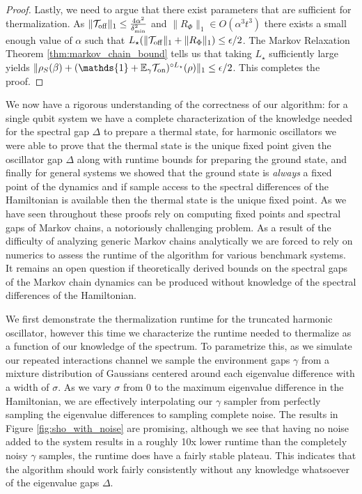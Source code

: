 \documentclass{article}
\newcommand{\on}{\rm on}
\newcommand{\off}{\rm off}
\newcommand{\norm}[1]{\| #1 \|}
\newcommand{\bigo}[1]{O\left(#1\right)}
\newcommand{\identity}{\mathds{1}}
\begin{document}
\begin{proof}
Lastly, we need to argue that there exist parameters that are sufficient for thermalization. As $\norm{\mathcal{T}_{\off}}_1 \le \frac{4 \alpha^2}{\delta_{\min}^2}$ and $\norm{R_{\Phi}}_1 \in \bigo{\alpha^3 t^3}$ there exists a small enough value of $\alpha$ such that $L_{\star}(\norm{\mathcal{T}_{\off}}_1 + \norm{R_{\Phi}}_1) \le \epsilon / 2$. The Markov Relaxation Theorem \ref{thm:markov_chain_bound} tells us that taking $L_{\star}$ sufficiently large yields $\norm{\rho_S(\beta) + (\identity + \mathbb{E}_{\gamma} \mathcal{T}_{\on})^{\circ L_{\star}}(\rho)}_1 \le \epsilon /2$. This completes the proof.
\end{proof}

We now have a rigorous understanding of the correctness of our algorithm: for a single qubit system we have a complete characterization of the knowledge needed for the spectral gap $\Delta$ to prepare a thermal state, for harmonic oscillators we were able to prove that the thermal state is the unique fixed point given the oscillator gap $\Delta$ along with runtime bounds for preparing the ground state, and finally for general systems we showed that the ground state is \emph{always} a fixed point of the dynamics and if sample access to the spectral differences of the Hamiltonian is available then the thermal state is the unique fixed point. As we have seen throughout these proofs rely on computing fixed points and spectral gaps of Markov chains, a notoriously challenging problem. As a result of the difficulty of analyzing generic Markov chains analytically we are forced to rely on numerics to assess the runtime of the algorithm for various benchmark systems. It remains an open question if theoretically derived bounds on the spectral gaps of the Markov chain dynamics can be produced without knowledge of the spectral differences of the Hamiltonian. 

We first demonstrate the thermalization runtime for the truncated harmonic oscillator, however this time we characterize the runtime needed to thermalize as a function of our knowledge of the spectrum. To parametrize this, as we simulate our repeated interactions channel we sample the environment gaps $\gamma$ from a mixture distribution of Gaussians centered around each eigenvalue difference with a width of $\sigma$. As we vary $\sigma$ from 0 to the maximum eigenvalue difference in the Hamiltonian, we are effectively interpolating our $\gamma$ sampler from perfectly sampling the eigenvalue differences to sampling complete noise. The results in Figure \ref{fig:sho_with_noise} are promising, although we see that having no noise added to the system results in a roughly 10x lower runtime than the completely noisy $\gamma$ samples, the runtime does have a fairly stable plateau. This indicates that the algorithm should work fairly consistently without any knowledge whatsoever of the eigenvalue gaps $\Delta$.
\end{document}
